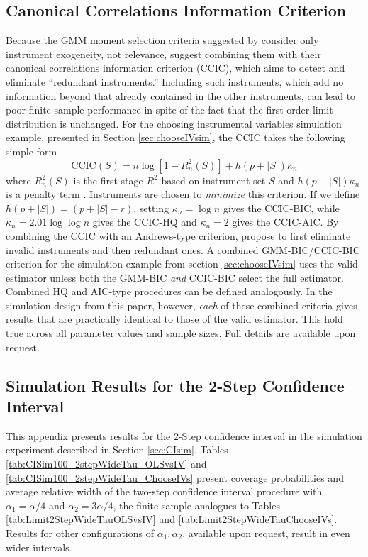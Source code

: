 \subsection{Canonical Correlations Information Criterion}
\label{sec:CCIC}
Because the GMM moment selection criteria suggested by \cite{Andrews1999} consider only instrument exogeneity, not relevance, \cite{HallPeixe2003} suggest combining them with their canonical correlations information criterion (CCIC), which aims to detect and eliminate ``redundant instruments.''
Including such instruments, which add no information beyond that already contained in the other instruments, can lead to poor finite-sample performance in spite of the fact that the first-order limit distribution is unchanged.
For the choosing instrumental variables simulation example, presented in Section \ref{sec:chooseIVsim}, the CCIC takes the following simple form
	\begin{equation}
	\mbox{CCIC}(S) = n \log\left[1 - R_n^2(S) \right] + h(p + |S|)\kappa_n
	\end{equation}
where $R_n^2(S)$ is the first-stage $R^2$ based on instrument set $S$ and $h(p + |S|)\kappa_n$ is a penalty term \citep{Jana2005}. 
Instruments are chosen to \emph{minimize} this criterion.
If we define $h(p + |S|) = (p + |S| - r)$, setting $\kappa_n = \log{n}$ gives the CCIC-BIC, while $\kappa_n = 2.01 \log{\log{n}}$ gives the CCIC-HQ and $\kappa_n = 2$ gives the CCIC-AIC.
By combining the CCIC with an Andrews-type criterion, \cite{HallPeixe2003} propose to first eliminate invalid instruments and then redundant ones.
A combined GMM-BIC/CCIC-BIC criterion for the simulation example from section \ref{sec:chooseIVsim} uses the valid estimator unless both the GMM-BIC \emph{and} CCIC-BIC select the full estimator.
Combined HQ and AIC-type procedures can be defined analogously.
In the simulation design from this paper, however, \emph{each} of these combined criteria gives results that are practically identical to those of the valid estimator.
This hold true across all parameter values and sample sizes.
Full details are available upon request.

\subsection{Simulation Results for the 2-Step Confidence Interval}
\label{append:conf_sim}

This appendix presents results for the 2-Step confidence interval in the simulation experiment described in Section \ref{sec:CIsim}.
Tables \ref{tab:CISim100_2stepWideTau_OLSvsIV} and \ref{tab:CISim100_2stepWideTau_ChooseIVs} 
present coverage probabilities and average relative width of the two-step confidence interval procedure with $\alpha_1 = \alpha/4$ and $\alpha_2 = 3\alpha/4$, the finite sample analogues to Tables \ref{tab:Limit2StepWideTauOLSvsIV} and \ref{tab:Limit2StepWideTauChooseIVs}. 
Results for other configurations of $\alpha_1, \alpha_2$, available upon request, result in even wider intervals.

